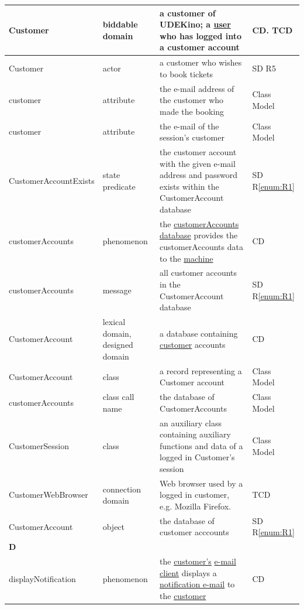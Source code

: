\documentclass[a4paper,10pt,titlepage,bibtotoc,bibtotocnumbered]{scrreprt}
\begin{document}
\begin{longtable}{|p{4cm}|p{3cm}|p{5cm}|l|}
\hline
\hypertarget{glossary:Customer}{Customer} & biddable domain & a customer of UDEKino; a \hyperlink{glossary:User}{user} who has logged into a customer account & CD. TCD\\
\hline
Customer & actor & a customer who wishes to book tickets & SD R5\\
\hline
customer & attribute & the e-mail address of the customer who made the booking & Class Model\\
\hline
customer & attribute & the e-mail of the session's customer & Class Model\\
\hline
CustomerAccountExists & state predicate & the customer account with the given e-mail address and password exists within the CustomerAccount database & SD R\ref{enum:R1}\\
\hline
\hypertarget{glossary:customerAccounts}{customerAccounts} & phenomenon & the \hyperlink{glossary:CustomerAccount}{customerAccounts database} provides the customerAccounts data to the \hyperlink{glossary:UDEKino}{machine} & CD\\
\hline
customerAccounts & message & all customer accounts in the CustomerAccount database & SD R\ref{enum:R1}\\
\hline
\hypertarget{glossary:CustomerAccount}{CustomerAccount} & lexical domain, designed domain & a database containing \hyperlink{glossary:Customer}{customer} accounts & CD\\
\hline
CustomerAccount & class & a record representing a Customer account & Class Model\\
\hline
customerAccounts & class call name & the database of CustomerAccounts & Class Model\\
\hline
CustomerSession & class & an auxiliary class containing auxiliary functions and data of a logged in Customer's session & Class Model\\
\hline
CustomerWebBrowser & connection domain & Web browser used by a logged in customer, e.g. Mozilla Firefox. & TCD\\
\hline
CustomerAccount & object & the database of customer acccounts & SD R\ref{enum:R1}\\
\hline
\multicolumn{4}{|l|}{\textbf{D}}\\
\hline
\hypertarget{glossary:displayNotification}{displayNotification} & phenomenon & the \hyperlink{glossary:Customer}{customer's} \hyperlink{glossary:Email}{e-mail client} displays a \hyperlink{glossary:notifyCustomer}{notification e-mail} to the \hyperlink{glossary:Customer}{customer} & CD\\

\end{longtable}
\end{document}
